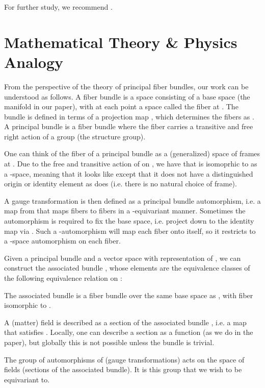 \documentclass{article}
\begin{document}
For further study, we recommend \cite{sharpeDifferentialGeometryCartan1997, shoshichikobayashiFoundationsDifferentialGeometry1963, husemollerFibreBundles1994a, steenrodTopologyFibreBundles, wendlLectureNotesBundles2008, craneDiscreteDifferentialGeometry2014}.


\section{Mathematical Theory \& Physics Analogy}
\label{sec:theory}

From the perspective of the theory of principal fiber bundles, our work can be understood as follows.
A fiber bundle  is a space consisting of a base space  (the manifold  in our paper), with at each point  a space  called the fiber at .
The bundle is defined in terms of a projection map , which determines the fibers as .
A principal bundle is a fiber bundle where the fiber  carries a transitive and free right action of a group  (the structure group).

One can think of the fiber  of a principal bundle as a (generalized) space of frames at .
Due to the free and transitive action of  on , we have that  is isomoprhic to  as a -space, meaning that it looks like  except that it does not have a distinguished origin or identity element as  does (i.e. there is no natural choice of frame).

A gauge transformation is then defined as a principal bundle automorphism, i.e. a map from  that maps fibers to fibers in a -equivariant manner.
Sometimes the automorphism is required to fix the base space, i.e. project down to the identity map via .
Such a -automorphism will map each fiber onto itself, so it restricts to a -space automorphism on each fiber.

Given a principal bundle  and a vector space  with representation  of , we can construct the associated bundle , whose elements are the equivalence classes of the following equivalence relation on :

The associated bundle is a fiber bundle over the same base space as , with fiber isomorphic to .

A (matter) field is described as a section of the associated bundle , i.e. a map 
 that satisfies .
Locally, one can describe a section as a function  (as we do in the paper), but globally this is not possible unless the bundle is trivial.

The group of automorphisms of  (gauge transformations) acts on the space of fields (sections of the associated bundle).
It is this group that we wish to be equivariant to.
\end{document}
